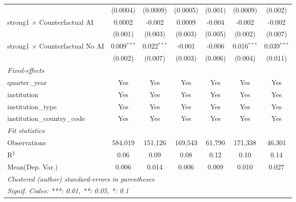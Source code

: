 \begin{tabular}{lcccccc}
                                          & (0.0004)      & (0.0009)      & (0.0005)      & (0.001)       & (0.0009)      & (0.002)\\   
   strong1 $\times$ Counterfactual AI     & 0.0002        & -0.002        & 0.0009        & -0.004        & -0.002        & -0.002\\   
                                          & (0.001)       & (0.003)       & (0.003)       & (0.005)       & (0.002)       & (0.007)\\   
   strong1 $\times$ Counterfactual No AI  & 0.009$^{***}$ & 0.022$^{***}$ & -0.001        & -0.006        & 0.016$^{***}$ & 0.039$^{***}$\\   
                                          & (0.002)       & (0.007)       & (0.003)       & (0.006)       & (0.004)       & (0.011)\\   
   \midrule
   \emph{Fixed-effects}\\
   quarter\_year                          & Yes           & Yes           & Yes           & Yes           & Yes           & Yes\\  
   institution                            & Yes           & Yes           & Yes           & Yes           & Yes           & Yes\\  
   institution\_type                      & Yes           & Yes           & Yes           & Yes           & Yes           & Yes\\  
   institution\_country\_code             & Yes           & Yes           & Yes           & Yes           & Yes           & Yes\\  
   \midrule
   \emph{Fit statistics}\\
   Observations                           & 584,019       & 151,126       & 169,543       & 61,790        & 171,338       & 46,301\\  
   R$^2$                                  & 0.06          & 0.09          & 0.08          & 0.12          & 0.10          & 0.14\\  
Mean(Dep. Var.) & 0.006 & 0.014 & 0.006 & 0.009 & 0.010 & 0.027 \\
   \midrule \midrule
   \multicolumn{7}{l}{\emph{Clustered (author) standard-errors in parentheses}}\\
   \multicolumn{7}{l}{\emph{Signif. Codes: ***: 0.01, **: 0.05, *: 0.1}}\\
\end{tabular}
\par\endgroup
